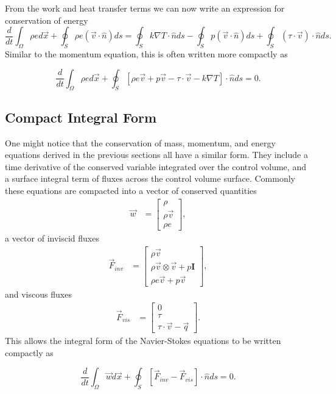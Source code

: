 From the work and heat transfer terms we can now write an expression for conservation of energy
\begin{equation}
\frac{d}{dt}\int_\Omega \rho e d\vec{x} + \oint_S \rho e (\vec{v} \cdot \hat{n}) ds = \oint_S k \nabla T \cdot \hat{n} ds - \oint_S p(\vec{v} \cdot \hat{n}) ds + \oint_S (\tau \cdot \vec{v})\cdot \hat{n} ds.
\end{equation}
Similar to the momentum equation, this is often written more compactly as
\begin{eqBox}
\begin{equation}
\frac{d}{dt}\int_\Omega \rho e d\vec{x} + \oint_S \left[ \rho e \vec{v} + p\vec{v} - \tau \cdot \vec{v} - k \nabla T \right] \cdot \hat{n} ds = 0.
\end{equation}
\end{eqBox}

\subsection{Compact Integral Form}
One might notice that the conservation of mass, momentum, and energy equations derived in the previous sections all have a similar form. They include a time derivative of the conserved variable integrated over the control volume, and a surface integral term of fluxes across the control volume surface. Commonly these equations are compacted into a vector of conserved quantities
\begin{align}
	\vec{w} &= \begin{bmatrix}
		\rho \\
	    \rho \vec{v} \\
	    \rho e
	\end{bmatrix},
\end{align}
a vector of inviscid fluxes
\begin{align}
	\vec{F}_{inv} &= \begin{bmatrix}
		\rho \vec{v} \\
	    \rho \vec{v} \otimes \vec{v} + p \mathbf{I} \\
	    \rho e \vec{v} + p\vec{v}
	\end{bmatrix},
\end{align}
and viscous fluxes
\begin{align}
	\vec{F}_{vis} &= \begin{bmatrix}
		0 \\
	    \tau \\
	    \tau \cdot \vec{v} - \vec{q}
	\end{bmatrix}.
\end{align}
This allows the integral form of the Navier-Stokes equations to be written compactly as
\begin{eqBox}
\begin{equation}
\label{eqn:compactintegral}
\frac{d}{dt}\int_\Omega \vec{w} d\vec{x} + \oint_S \left[\vec{F}_{inv} - \vec{F}_{vis}\right] \cdot \hat{n} ds = 0.
\end{equation}
\end{eqBox}


